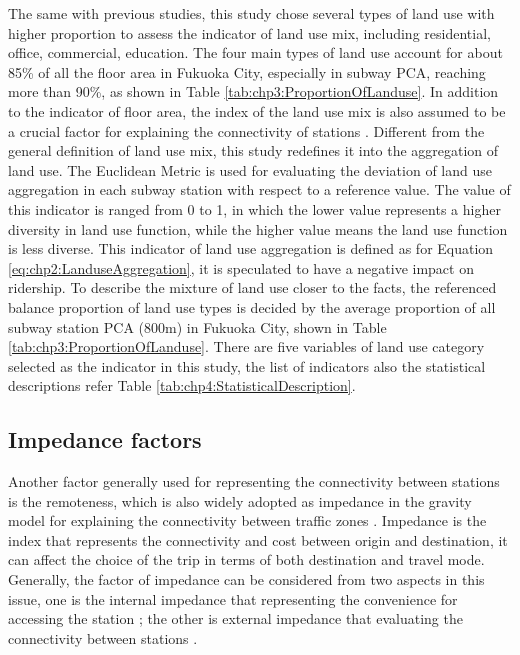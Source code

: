 %
The same with previous studies, this study chose several types of land use with higher proportion to assess the indicator of land use mix, including residential, office, commercial, education. The four main types of land use account for about 85\% of all the floor area in Fukuoka City, especially in subway PCA, reaching more than 90\%, as shown in Table \ref{tab:chp3:ProportionOfLanduse}. In addition to the indicator of floor area, the index of the land use mix is also assumed to be a crucial factor for explaining the connectivity of stations \cite{badoe2000transportation,cervero2004transit,frank2004obesity}. Different from the general definition of land use mix, this study redefines it into the aggregation of land use. The Euclidean Metric is used for evaluating the deviation of land use aggregation in each subway station with respect to a reference value. The value of this indicator is ranged from 0 to 1, in which the lower value represents a higher diversity in land use function, while the higher value means the land use function is less diverse. This indicator of land use aggregation is defined as for Equation \ref{eq:chp2:LanduseAggregation}, it is speculated to have a negative impact on ridership. To describe the mixture of land use closer to the facts, the referenced balance proportion of land use types is decided by the average proportion of all subway station PCA (800m) in Fukuoka City, shown in Table \ref{tab:chp3:ProportionOfLanduse}. There are five variables of land use category selected as the indicator in this study, the list of indicators also the statistical descriptions refer Table \ref{tab:chp4:StatisticalDescription}.

%
\subsection{Impedance factors}
%
Another factor generally used for representing the connectivity between stations is the remoteness, which is also widely adopted as impedance in the gravity model for explaining the connectivity between traffic zones \cite{iwanow2007trade,kepaptsoglou2010gravity,nitsch2000national}. Impedance is the index that represents the connectivity and cost between origin and destination, it can affect the choice of the trip in terms of both destination and travel mode. Generally, the factor of impedance can be considered from two aspects in this issue, one is the internal impedance that representing the convenience for accessing the station \cite{chu2004ridership,chakraborty2013land}; the other is external impedance that evaluating the connectivity between stations \cite{sohn2010factors}.

